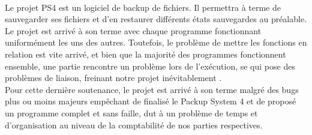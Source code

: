 \paragraph*{}
Le projet PS4 est un logiciel de backup de fichiers. Il permettra à terme de sauvegarder ses fichiers et d'en restaurer différents états sauvegardes au préalable. Le projet est arrivé à son terme avec chaque programme fonctionnant uniformément les uns des autres. Toutefois, le problème de mettre les fonctions en relation est vite arrivé, et bien que la majorité des programmes fonctionnent ensemble, une partie rencontre un problème lors de l'exécution, se qui pose des problèmes de liaison, freinant notre projet inévitablement .\\
Pour cette dernière soutenance, le projet est arrivé à son terme malgré des bugs plus ou moins majeurs empêchant de finalisé le Packup System 4 et de proposé un programme complet et sans faille, dut à un problème de temps et d'organisation au niveau de la comptabilité de nos parties respectives.